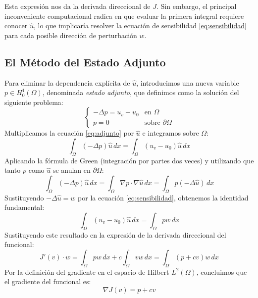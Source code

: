 \documentclass[11pt,a4paper]{article}
\begin{document}
	Esta expresión nos da la derivada direccional de $J$. Sin embargo, el principal inconveniente computacional radica en que evaluar la primera integral requiere conocer $\hat{u}$, lo que implicaría resolver la ecuación de sensibilidad \eqref{eq:sensibilidad} para cada posible dirección de perturbación $w$.
	
	\subsection{El Método del Estado Adjunto}
	Para eliminar la dependencia explícita de $\hat{u}$, introducimos una nueva variable $p \in H^1_0(\Omega)$, denominada \textit{estado adjunto}, que definimos como la solución del siguiente problema:
	\begin{equation} \label{eq:adjunto}
		\begin{cases}
			-\Delta p = u_v - u_0 & \text{en } \Omega \\
			p = 0 & \text{sobre } \partial\Omega
		\end{cases}
	\end{equation}
	Multiplicamos la ecuación \eqref{eq:adjunto} por $\hat{u}$ e integramos sobre $\Omega$:
	\begin{equation*}
		\int_\Omega (-\Delta p) \hat{u} \, dx = \int_\Omega (u_v - u_0)\hat{u} \, dx
	\end{equation*}
	Aplicando la fórmula de Green (integración por partes dos veces) y utilizando que tanto $p$ como $\hat{u}$ se anulan en $\partial\Omega$:
	\begin{equation*}
		\int_\Omega (-\Delta p) \hat{u} \, dx = \int_\Omega \nabla p \cdot \nabla \hat{u} \, dx = \int_\Omega p (-\Delta \hat{u}) \, dx
	\end{equation*}
	Sustituyendo $-\Delta \hat{u} = w$ por la ecuación \eqref{eq:sensibilidad}, obtenemos la identidad fundamental:
	\begin{equation*}
		\int_\Omega (u_v - u_0)\hat{u} \, dx = \int_\Omega p w \, dx
	\end{equation*}
	Sustituyendo este resultado en la expresión de la derivada direccional del funcional:
	\begin{equation*}
		J'(v) \cdot w = \int_\Omega p w \, dx + c \int_\Omega v w \, dx = \int_\Omega (p + cv) w \, dx
	\end{equation*}
	Por la definición del gradiente en el espacio de Hilbert $L^2(\Omega)$, concluimos que el gradiente del funcional es:
	\begin{equation} \label{eq:gradiente}
		\nabla J(v) = p + c v
	\end{equation}
	
\end{document}
